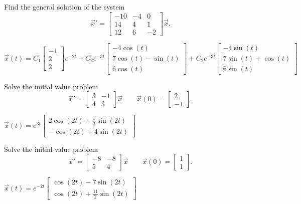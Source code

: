 \begin{exercise}%
Find the general solution of the system
\begin{equation*}
{\vec{x}}' = \begin{bmatrix} -10 & -4 & 0 \\ 14 & 4 & 1 \\ 12 & 6 & -2 \end{bmatrix} \vec{x}.
\end{equation*}
\end{exercise}
\comboSol{%
}
{%
$\vec{x}(t) = C_1\left[\begin{smallmatrix} -1 \\ 2 \\ 2 \end{smallmatrix}\right]e^{-2t} + C_2e^{-3t} \left[\begin{smallmatrix} -4\cos(t) \\ 7\cos(t) - \sin(t) \\ 6\cos(t)  \end{smallmatrix}\right] + C_2e^{-3t}\left[\begin{smallmatrix} -4\sin(t) \\ 7\sin(t) + \cos(t) \\ 6\sin(t) \end{smallmatrix}\right]$
}

\begin{exercise}
Solve the initial value problem
\[ {\vec{x}}' = \begin{bmatrix} 3 & -1 \\ 4 & 3 \end{bmatrix} \vec{x} \qquad \vec{x}(0) = \begin{bmatrix} 2 \\ -1 \end{bmatrix}. \]
\end{exercise}
\comboSol{%
}
{%
$\vec{x}(t) = e^{3t} \left[\begin{smallmatrix}2\cos(2t) + \frac{1}{2}\sin(2t) \\ -\cos(2t) + 4\sin(2t) \end{smallmatrix}\right]$
}


\begin{exercise}
Solve the initial value problem
\[ {\vec{x}}' = \begin{bmatrix} -8 & -8 \\ 5 & 4 \end{bmatrix} \vec{x} \qquad \vec{x}(0) = \begin{bmatrix} 1 \\ 1 \end{bmatrix}. \]
\end{exercise}
\comboSol{%
}
{%
$\vec{x}(t) = e^{-2t}\left[\begin{smallmatrix} \cos(2t) - 7\sin(2t)\\ \cos(2t) + \frac{11}{2}\sin(2t) \end{smallmatrix}\right]$
}

